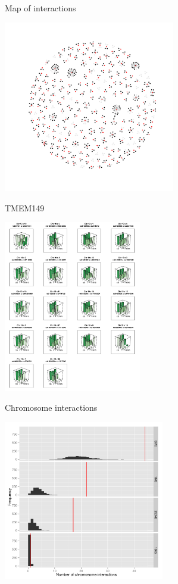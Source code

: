 \documentclass{beamer}
\begin{document}
\begin{frame}{Map of interactions}
	\begin{center}
		\includegraphics[height=7.5cm]{pale_gray_graph_of_interactions_2_lists}
	\end{center}
\end{frame}


\begin{frame}{TMEM149}
	\begin{center}
		\includegraphics[height=7.5cm]{TMEM149_3d}
	\end{center}
\end{frame}


\begin{frame}{Chromosome interactions}
	\begin{center}
		\includegraphics[height=7cm]{chromosome_interactions}
	\end{center}
\end{frame}
\end{document}
